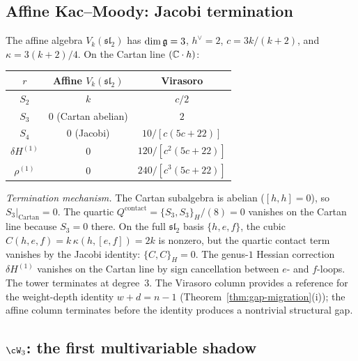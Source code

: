 \subsection{Affine Kac--Moody: Jacobi termination}%
\label{subsec:affine-shadow}%

\begin{computation}%
\label{comp:affine-shadow-tower}%
%
The affine algebra $V_k(\mathfrak{sl}_2)$ has
$\dim\mathfrak{g} = 3$, $h^\vee = 2$,
$c = 3k/(k+2)$, and $\kappa = 3(k+2)/4$. On the Cartan
line $(\mathbb{C}\cdot h)$:
\begin{center}
\small
\renewcommand{\arraystretch}{1.2}
\begin{tabular}{ccc}
\toprule
$r$ & Affine $V_k(\mathfrak{sl}_2)$ & Virasoro \\
\midrule
$S_2$ & $k$ & $c/2$ \\
$S_3$ & $0$ (Cartan abelian) & $2$ \\
$S_4$ & $0$ (Jacobi) & $10/[c(5c{+}22)]$ \\
$\delta H^{(1)}$ & $0$ & $120/[c^2(5c{+}22)]$ \\
$\rho^{(1)}$ & $0$ & $240/[c^3(5c{+}22)]$ \\
\bottomrule
\end{tabular}
\end{center}

\emph{Termination mechanism.}
The Cartan subalgebra is abelian ($[h,h]=0$), so
$S_3|_{\mathrm{Cartan}} = 0$. The quartic
$Q^{\mathrm{contact}} = \{S_3, S_3\}_H/(8) = 0$
vanishes on the Cartan line because $S_3 = 0$ there.
On the full $\mathfrak{sl}_2$ basis $\{h,e,f\}$,
the cubic $C(h,e,f) = k\,\kappa(h,[e,f]) = 2k$ is nonzero,
but the quartic contact term vanishes by the Jacobi
identity: $\{C, C\}_H = 0$. The genus-$1$ Hessian
correction $\delta H^{(1)}$ vanishes on the Cartan line by
sign cancellation between $e$- and $f$-loops.
The tower terminates at degree~$3$. The Virasoro column provides a reference for the weight-depth identity $w + d = n - 1$ (Theorem~\ref{thm:gap-migration}(i)); the affine column terminates before the identity produces a nontrivial structural gap.
\end{computation}

\subsection{$\cW_3$: the first multivariable shadow}%
\label{subsec:w3-shadow}%


